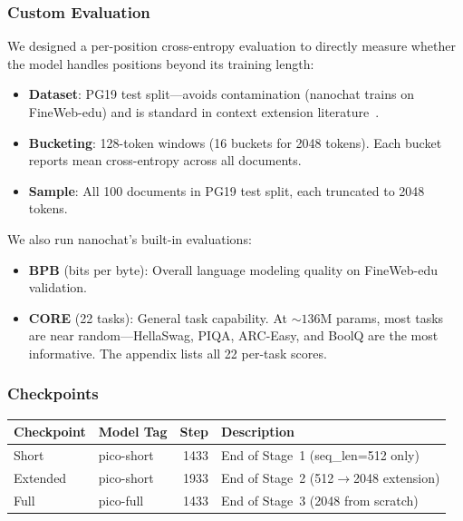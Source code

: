 \subsubsection{Custom Evaluation}

We designed a per-position cross-entropy evaluation to directly measure whether the model handles positions beyond its training length:

\begin{itemize}
  \item \textbf{Dataset}: PG19 test split---avoids contamination (nanochat trains on FineWeb-edu) and is standard in context extension literature~\cite{pi,yarn,longrope}.
  \item \textbf{Bucketing}: 128-token windows (16 buckets for 2048 tokens). Each bucket reports mean cross-entropy across all documents.
  \item \textbf{Sample}: All 100 documents in PG19 test split, each truncated to 2048 tokens.
\end{itemize}

We also run nanochat's built-in evaluations:
\begin{itemize}
  \item \textbf{BPB} (bits per byte): Overall language modeling quality on FineWeb-edu validation.
  \item \textbf{CORE} (22 tasks): General task capability. At ${\sim}136$M params, most tasks are near random---HellaSwag, PIQA, ARC-Easy, and BoolQ are the most informative. The appendix lists all 22 per-task scores.
\end{itemize}

\subsubsection{Checkpoints}

\begin{table}[H]
\centering\small
\begin{tabular}{@{}llrl@{}}
\toprule
Checkpoint & Model Tag & Step & Description \\
\midrule
Short & pico-short & 1433 & End of Stage~1 (seq\_len=512 only) \\
Extended & pico-short & 1933 & End of Stage~2 (512$\to$2048 extension) \\
Full & pico-full & 1433 & End of Stage~3 (2048 from scratch) \\
\bottomrule
\end{tabular}
\end{table}

